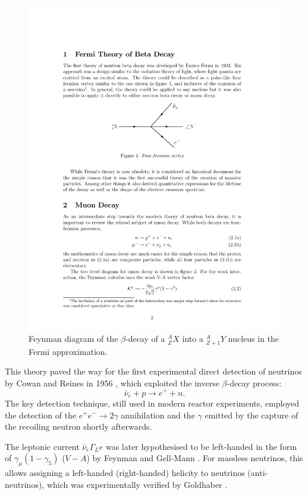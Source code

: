 \begin{figure}
    \centering
    \includegraphics[width=0.7\linewidth]{figures/fermidecay.pdf}
    \caption{Feynman diagram of the $\beta$-decay of a $^{A}_{Z}X$ into a $^{A}_{Z+1}Y$ nucleus in the Fermi approximation.}
    \label{fig:fermibeta}
\end{figure}

This theory paved the way for the first experimental direct detection of neutrinos by Cowan and Reines in 1956 \cite{Cowan:1992xc}, which exploited the inverse $\beta$-decay process:
\begin{equation}
    \bar{\nu}_{e} + p \rightarrow e^{+} + n.
\end{equation}
The key detection technique, still used in modern reactor experiments, employed the detection of the $e^{+}e^{-}\rightarrow 2\gamma$ annihilation and the $\gamma$ emitted by the capture of the recoiling neutron shortly afterwards. 

The leptonic current $\bar{\nu}_{e}\Gamma_{L}e$ was later hypothesised to be left-handed in the form of $\gamma_{\mu}(1-\gamma_{5})$ ($V-A$) by Feynman and Gell-Mann \cite{Feynman:1958ty}.
For massless neutrinos, this allows assigning a left-handed (right-handed) helicity to neutrinos (anti-neutrinos), which was experimentally verified by Goldhaber \cite{Goldhaber:1958nb}.

